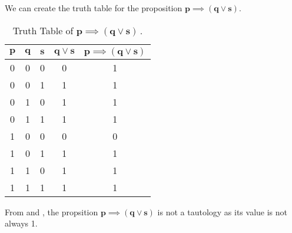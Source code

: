 \begin{subquestions}
\begin{subsubquestions}
We can create the truth table for the proposition $\boldsymbol{p \implies (q \lor s)}$.
\begin{table}[ht]
	\centering
	\begin{tabular}{|c|c|c|c|c|}
		\hline
		$\boldsymbol{p}$ & $\boldsymbol{q}$ & $\boldsymbol{s}$ & $\boldsymbol{q \lor s}$ & $\boldsymbol{p \implies (q \lor s)}$ \\
		\hline
		0 & 0 & 0 & 0 & 1 \\
		0 & 0 & 1 & 1 & 1 \\
		0 & 1 & 0 & 1 & 1 \\
		0 & 1 & 1 & 1 & 1 \\
		1 & 0 & 0 & 0 & 0 \\
		1 & 0 & 1 & 1 & 1 \\
		1 & 1 & 0 & 1 & 1 \\
		1 & 1 & 1 & 1 & 1 \\
		\hline
	\end{tabular}
	\caption{\label{2016:q1:tab:TruthTab2} Truth Table of $\boldsymbol{p \implies (q \lor s)}$\,.}
\end{table}

From  and , the propsition $\boldsymbol{p \implies (q \lor s)}$ is not a tautology as its value is not always 1.

\end{subsubquestions}

\end{subquestions}

